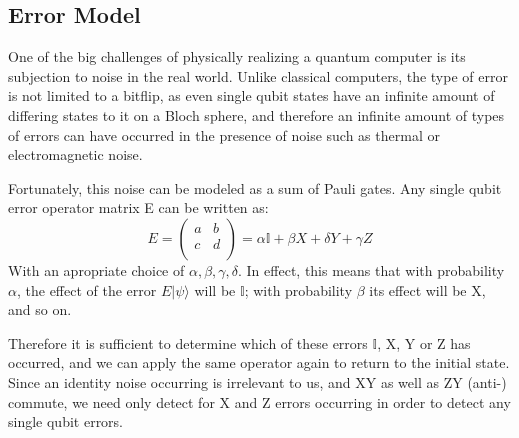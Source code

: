 \subsection{Error Model}
One of the big challenges of physically realizing a quantum 
computer is its subjection to noise in the real world.
Unlike classical computers, the type of error is not limited
to a bitflip, as even single qubit states have an
infinite amount of differing states to it on a Bloch sphere,
and therefore an infinite amount of types of errors can have
occurred in the presence of noise such as thermal or electromagnetic
noise.

Fortunately, this noise can be modeled as a sum of Pauli gates.
Any single qubit error operator matrix E can be written as:
\begin{equation}
    E =
    \left(
    \begin{array}{cc}
        a & b \\
        c & d \\
    \end{array}
    \right) = 
    \alpha \mathbb{I} + \beta X + \delta Y + \gamma Z
\end{equation}
With an apropriate choice of $\alpha, \beta, \gamma, \delta$.
In effect, this means that with probability $\alpha$, the effect of the
error $E|\psi\rangle$ will be $\mathbb{I}$; with probability $\beta$ its effect
will be X, and so on.

Therefore it is sufficient to determine which of these errors $\mathbb{I}$, 
X, Y or Z has occurred, and we can apply the same operator again to return to the 
initial state.
Since an identity noise occurring is irrelevant to us, and XY as
well as ZY (anti-) commute, we need only detect for X and Z
errors occurring in order to detect any single qubit errors. 